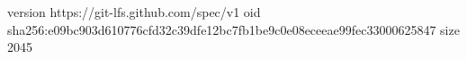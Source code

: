 version https://git-lfs.github.com/spec/v1
oid sha256:e09bc903d610776cfd32c39dfe12bc7fb1be9c0e08eceeae99fec33000625847
size 2045
